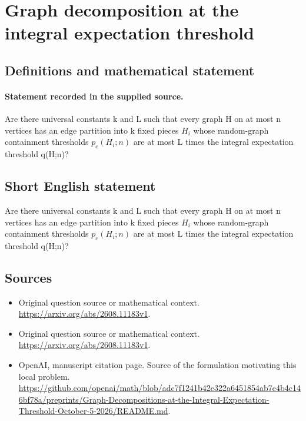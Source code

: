 \documentclass[11pt]{article}
\begin{document}
\section*{Graph decomposition at the integral expectation threshold}\label{statement}
\subsection{Definitions and mathematical statement}
\paragraph{Statement recorded in the supplied source.}
Are there universal constants k and L such that every graph H on at most n vertices has an edge partition into k fixed pieces $H_i$ whose random-graph containment thresholds $p_c(H_i;n)$ are at most L times the integral expectation threshold q(H;n)?
\subsection{Short English statement}
Are there universal constants k and L such that every graph H on at most n vertices has an edge partition into k fixed pieces $H_i$ whose random-graph containment thresholds $p_c(H_i;n)$ are at most L times the integral expectation threshold q(H;n)?
\subsection{Sources}
\begin{itemize}
\item[S1] Original question source or mathematical context.
\url{https://arxiv.org/abs/2608.11183v1}.
\item[S2] Original question source or mathematical context.
\url{https://arxiv.org/abs/2608.11183v1}.
\item[S3] OpenAI, manuscript citation page. Source of the formulation motivating this local problem.
\url{https://github.com/openai/math/blob/adc7f1241b42e322a6451854ab7e4b4c146bf78a/preprints/Graph-Decompositions-at-the-Integral-Expectation-Threshold-October-5-2026/README.md}.
\end{itemize}
\end{document}
